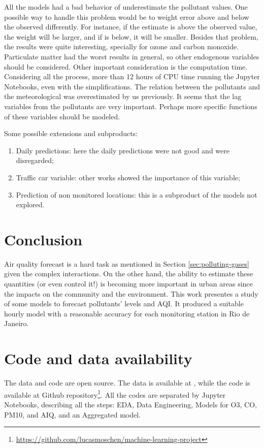All the models had a bad behavior of underestimate the pollutant values. One
possible way to handle this problem would be to weight error above and below
the observed differently. For instance, if the estimate is above the observed
value, the weight will be larger, and if is below, it will be smaller. Besides
that problem, the results were quite interesting, specially for ozone and
carbon monoxide. Particulate matter had the worst results in general, so other
endogenous variables should be considered. Other important consideration is
the computation time. Considering all the process, more than 12 hours of CPU
time running the Jupyter Notebooks, even with the simplifications. The
relation between the pollutants and the meteorological was overestimated by us
previously. It seems that the lag variables from the pollutants are very
important. Perhaps more specific functions of these variables should be
modeled. 

Some possible extensions and subproducts: 

\begin{enumerate}
    \item Daily predictions: here the daily predictions were not good and were
    disregarded; 
    \item Traffic car variable: other works showed the importance of this
    variable; 
    \item Prediction of non monitored locations: this is a subproduct of the
    models not explored. 
\end{enumerate}

\section{Conclusion}
\label{sec:conclusion}

Air quality forecast is a hard task as mentioned in Section
\ref{sec:polluting-gases} given the complex interactions. On the other hand,
the ability to estimate these quantities (or even control it!) is becoming
more important in urban areas since the impacts on the community and the
environment. This work presentes a study of some models to forecast
pollutants' levels and AQI. It produced a suitable hourly model with a
reasonable accuracy for each monitoring station in Rio de Janeiro.

\section{Code and data availability}

The data and code are open source. The data is available at
\cite{dataset-rio-ar-quality}, while the code is available at Github
repository\footnote{\url{https://github.com/lucasmoschen/machine-learning-project}}.
All the codes are separated by Jupyter Notebooks, describing all the steps:
EDA, Data Engineering, Models for O3, CO, PM10, and AIQ, and an Aggregated
model. 